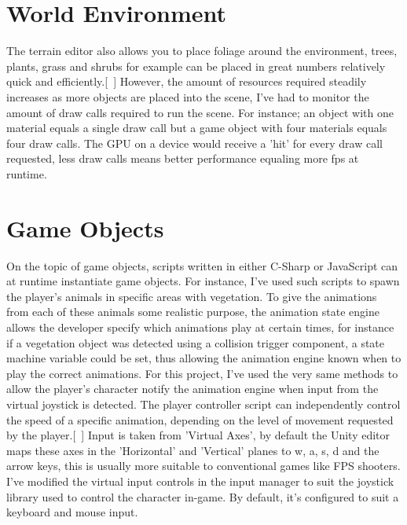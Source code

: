 \section{World Environment}
The terrain editor also allows you to place foliage around the environment, trees, plants, grass and shrubs for example can be placed in great numbers relatively quick and efficiently.[~\cite{Scenes}] However, the amount of resources required steadily increases as more objects are placed into the scene, I've had to monitor the amount of draw calls required to run the scene. For instance; an object with one material equals a single draw call but a game object with four materials equals four draw calls. The GPU on a device would receive a 'hit' for every draw call requested, less draw calls means better performance equaling more fps at runtime.
\section{Game Objects}
On the topic of game objects, scripts written in either C-Sharp or JavaScript can at runtime instantiate game objects. For instance, I've used such scripts to spawn the player's animals in specific areas with vegetation. To give the animations from each of these animals some realistic purpose, the animation state engine allows the developer specify which animations play at certain times, for instance if a vegetation object was detected using a collision trigger component, a state machine variable could be set, thus allowing the animation engine known when to play the correct animations. For this project, I've used the very same methods to allow the player's character notify the animation engine when input from the virtual joystick is detected. The player controller script can independently control the speed of a specific animation, depending on the level of movement requested by the player.[~\cite{Game-Objects}] Input is taken from 'Virtual Axes', by default the Unity editor maps these axes in the 'Horizontal' and 'Vertical' planes to w, a, s, d and the arrow keys, this is usually more suitable to conventional games like FPS shooters. I've modified the virtual input controls in the input manager to suit the joystick library used to control the character in-game. By default, it's configured to suit a keyboard and mouse input.
